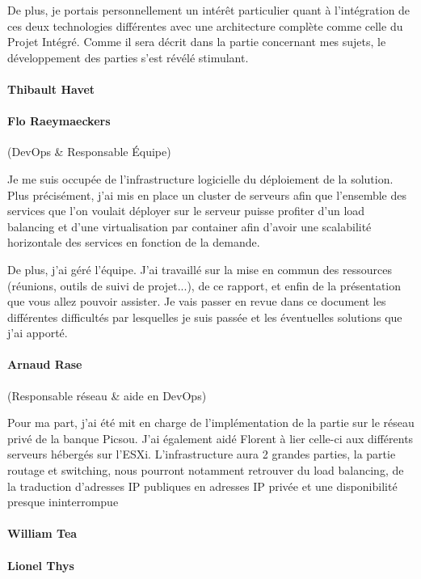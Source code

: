 De plus, je portais personnellement un intérêt particulier quant à l'intégration de ces deux technologies différentes avec une architecture complète comme celle du Projet Intégré. Comme il sera décrit dans la partie concernant mes sujets, le développement des parties s'est révélé stimulant. 

\paragraph{Thibault Havet}
\paragraph{Flo Raeymaeckers} (DevOps \& Responsable Équipe)

Je me suis occupée de l'infrastructure logicielle du déploiement de la solution. Plus précisément, j'ai mis en place un cluster de serveurs afin que l'ensemble des services que l'on voulait déployer sur le serveur puisse profiter d'un load balancing et d'une virtualisation par container afin d'avoir une scalabilité horizontale des services en fonction de la demande.

De plus, j'ai géré l'équipe. J'ai travaillé sur la mise en commun des ressources (réunions, outils de suivi de projet...), de ce rapport, et enfin de la présentation que vous allez pouvoir assister. Je vais passer en revue dans ce document les différentes difficultés par lesquelles je suis passée et les éventuelles solutions que j'ai apporté.

\paragraph{Arnaud Rase} (Responsable réseau \& aide en DevOps)

Pour ma part, j'ai été mit en charge de l'implémentation de la partie sur le réseau privé de la
banque Picsou. J'ai également aidé Florent à lier celle-ci aux différents serveurs hébergés sur
l'ESXi. L'infrastructure aura 2 grandes parties, la partie routage et switching, nous pourront
notamment retrouver du load balancing, de la traduction d'adresses IP publiques en adresses
IP privée et une disponibilité presque ininterrompue

\paragraph{William Tea}
\paragraph{Lionel Thys}
